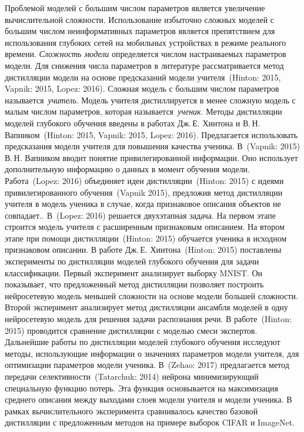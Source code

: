 \documentclass{dissert}
\begin{document}
Проблемой моделей с большим числом параметров является увеличение вычислительной сложности.
Использование избыточно сложных моделей с большим числом неинформативных параметров является препятствием для использования глубоких сетей на мобильных устройствах в режиме реального времени. \textit{Сложность модели} определяется числом настраиваемых параметров модели.
Для снижения числа параметров в литературе рассматривается метод дистилляции модели на основе предсказаний модели учителя~(Hinton: 2015, Vapnik: 2015, Lopez: 2016).
Сложная модель с большим числом параметров называется~\textit{учитель}. Модель учителя дистиллируется в менее сложную модель с малым числом параметров, которая называется~\textit{ученик}.
Методы дистилляции моделей глубокого обучения введены в работах Дж.\,Е. Хинтона и В.\,Н. Вапником~(Hinton: 2015, Vapnik: 2015, Lopez: 2016).
Предлагается использовать предсказания модели учителя для повышения качества ученика.
В~(Vapnik: 2015) В.\,Н. Вапником вводит понятие привилегированной информации. Оно использует дополнительную информацию о данных в момент обучения модели.
Работа~(Lopez: 2016) объединяет идеи дистилляции~(Hinton: 2015) с идеями привилегированного обучения~(Vapnik 2015), предложив метод дистилляции учителя в модель ученика в случае, когда признаковое описания объектов не совпадает..
В~(Lopez: 2016) решается двухэтапная задача. На первом этапе строится модель учителя с расширенным признаковым описанием.
На втором этапе при помощи дистилляции~(Hinton: 2015) обучается ученика в исходном признаковом описании.
В работе Дж.\,Е. Хинтона~(Hinton: 2015) поставлены эксперименты по дистилляции моделей глубокого обучения для задачи классификации.
Первый эксперимент анализирует выборку MNIST. Он показывает, что предложенный метод дистилляции позволяет построить нейросетевую модель меньшей сложности на основе модели большей сложности.
Второй эксперимент анализирует метод дистилляции ансамбля моделей в одну нейросетевую модель для решения задачи распознания речи. В работе~(Hinton: 2015) проводится сравнение дистилляции с моделью смеси экспертов.
Дальнейшие работы по дистилляции моделей глубокого обучения исследуют методы, использующие информации о значениях параметров модели учителя, для оптимизации параметров модели ученика. В~(Zehao: 2017) предлагается метод передачи селективности~(Tatarchuk: 2014) нейрона минимизирующий специальную функцию потерь. Эта функция основывается на максимизация среднего описания между выходами слоев модели учителя и модели ученика. В рамках вычислительного эксперимента сравнивалось качество базовой дистилляции с предложенным методов на примере выборок CIFAR и ImageNet.
\end{document}
